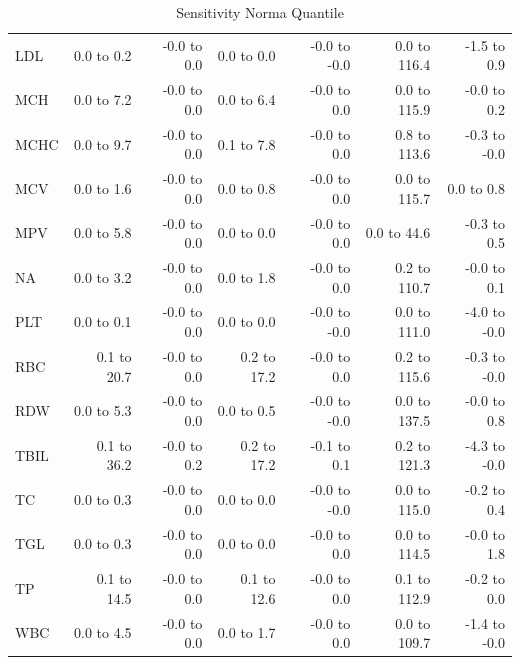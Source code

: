 \begin{table}[ht]
\begin{tabular}{lrrrrrr}
LDL & 0.0 to 0.2 & -0.0 to 0.0 & 0.0 to 0.0 & -0.0 to -0.0 & 0.0 to 116.4 & -1.5 to 0.9 \\
MCH & 0.0 to 7.2 & -0.0 to 0.0 & 0.0 to 6.4 & -0.0 to 0.0 & 0.0 to 115.9 & -0.0 to 0.2 \\
MCHC & 0.0 to 9.7 & -0.0 to 0.0 & 0.1 to 7.8 & -0.0 to 0.0 & 0.8 to 113.6 & -0.3 to -0.0 \\
MCV & 0.0 to 1.6 & -0.0 to 0.0 & 0.0 to 0.8 & -0.0 to 0.0 & 0.0 to 115.7 & 0.0 to 0.8 \\
MPV & 0.0 to 5.8 & -0.0 to 0.0 & 0.0 to 0.0 & -0.0 to 0.0 & 0.0 to 44.6 & -0.3 to 0.5 \\
NA & 0.0 to 3.2 & -0.0 to 0.0 & 0.0 to 1.8 & -0.0 to 0.0 & 0.2 to 110.7 & -0.0 to 0.1 \\
PLT & 0.0 to 0.1 & -0.0 to 0.0 & 0.0 to 0.0 & -0.0 to -0.0 & 0.0 to 111.0 & -4.0 to -0.0 \\
RBC & 0.1 to 20.7 & -0.0 to 0.0 & 0.2 to 17.2 & -0.0 to 0.0 & 0.2 to 115.6 & -0.3 to -0.0 \\
RDW & 0.0 to 5.3 & -0.0 to 0.0 & 0.0 to 0.5 & -0.0 to -0.0 & 0.0 to 137.5 & -0.0 to 0.8 \\
TBIL & 0.1 to 36.2 & -0.0 to 0.2 & 0.2 to 17.2 & -0.1 to 0.1 & 0.2 to 121.3 & -4.3 to -0.0 \\
TC & 0.0 to 0.3 & -0.0 to 0.0 & 0.0 to 0.0 & -0.0 to -0.0 & 0.0 to 115.0 & -0.2 to 0.4 \\
TGL & 0.0 to 0.3 & -0.0 to 0.0 & 0.0 to 0.0 & -0.0 to 0.0 & 0.0 to 114.5 & -0.0 to 1.8 \\
TP & 0.1 to 14.5 & -0.0 to 0.0 & 0.1 to 12.6 & -0.0 to 0.0 & 0.1 to 112.9 & -0.2 to 0.0 \\
WBC & 0.0 to 4.5 & -0.0 to 0.0 & 0.0 to 1.7 & -0.0 to 0.0 & 0.0 to 109.7 & -1.4 to -0.0 \\
\bottomrule
\end{tabular}
\caption{Sensitivity Norma Quantile}
\label{tab:sensitivity_norma_quantile}
\end{table}